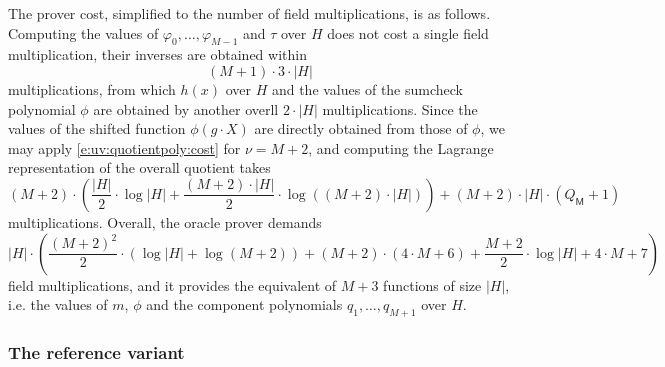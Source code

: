 The prover cost, simplified to the number of field multiplications, is as follows.
Computing the values of $\varphi_0, \ldots, \varphi_{M-1}$ and $\tau$ over $H$ does not cost a single field multiplication, their inverses are obtained within
\[
(M+1)\cdot 3\cdot |H| 
\]
multiplications, from which $h(x)$ over $H$ and the values of the sumcheck polynomial $\phi$ are obtained by another overll $2\cdot |H|$ multiplications.
Since the values of the shifted function $\phi(g\cdot X)$ are directly obtained from those of $\phi$, we may apply 
\eqref{e:uv:quotientpoly:cost} for $\nu = M + 2$, and computing the Lagrange representation of the overall quotient takes
\[
(M + 2) \cdot \left(\frac{|H|}{2}\cdot \log|H| + \frac{(M+2)\cdot |H|}{2} \cdot\log((M+2)\cdot|H|) \right) + (M+2)\cdot |H|\cdot (Q_\mathsf M + 1)
\]
multiplications.
Overall, the oracle prover demands
\begin{equation}
 |H| \cdot\left(\frac{(M + 2)^2}{2}\cdot (\log|H| + \log (M+2)) +  (M + 2)\cdot(4\cdot M+6) + \frac{M+2}{2} \cdot \log |H| + 4\cdot M + 7   \right)
\end{equation}
field multiplications, and it provides the equivalent of $M + 3$ functions of size $|H|$, i.e. the values of $m$, $\phi$  and the component polynomials $q_1, \ldots, q_{M+1}$ over $H$.


\subsubsection{The reference variant}

%
%
% 




